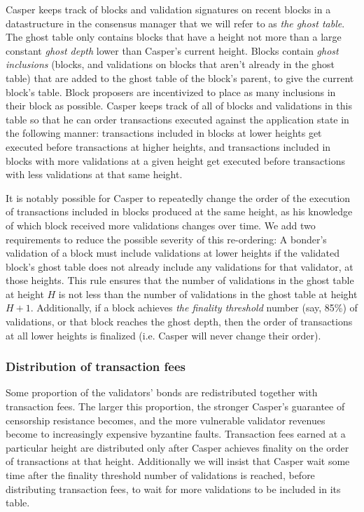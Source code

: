 \documentclass[11pt,a4paper]{article}
\begin{document}
Casper keeps track of blocks and validation signatures on recent blocks in a datastructure in the consensus manager that we will refer to as \emph{the ghost table}. The ghost table only contains blocks that have a height not more than a large constant \emph{ghost depth} lower than Casper's current height. Blocks contain \emph{ghost inclusions} (blocks, and validations on blocks that aren't already in the ghost table) that are added to the ghost table of the block's parent, to give the current block's table. Block proposers are incentivized to place as many inclusions in their block as possible. Casper keeps track of all of blocks and validations in this table so that he can order transactions executed against the application state in the following manner: transactions included in blocks at lower heights get executed before transactions at higher heights, and transactions included in blocks with more validations at a given height get executed before transactions with less validations at that same height.

It is notably possible for Casper to repeatedly change the order of the execution of transactions included in blocks produced at the same height, as his knowledge of which block received more validations changes over time. We add two requirements to reduce the possible severity of this re-ordering: A bonder's validation of a block must include validations at lower heights if the validated block's ghost table does not already include any validations for that validator, at those heights. This rule ensures that the number of validations in the ghost table at height $H$ is not less than the number of validations in the ghost table at height $H + 1$. Additionally, if a block achieves \emph{the finality threshold} number (say, 85\%) of validations, or that block reaches the ghost depth, then the order of transactions at all lower heights is finalized (i.e. Casper will never change their order).


\subsubsection{Distribution of transaction fees}

Some proportion of the validators' bonds are redistributed together with transaction fees. The larger this proportion, the stronger Casper's guarantee of censorship resistance becomes, and the more vulnerable validator revenues become to increasingly expensive byzantine faults. Transaction fees earned at a particular height are distributed only after Casper achieves finality on the order of transactions at that height. Additionally we will insist that Casper wait some time after the finality threshold number of validations is reached, before distributing transaction fees, to wait for more validations to be included in its table.
\end{document}
